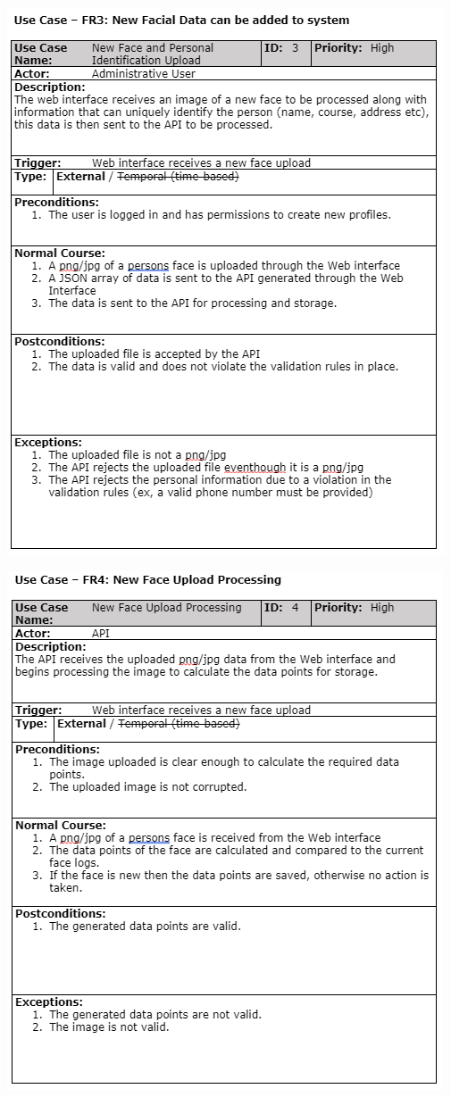 \documentclass[
  english,
  a4paper,
,tablecaptionabove
]{scrartcl}
\begin{document}
\includegraphics{images/ppm-images/use-case-3.png} \newpage

\includegraphics{images/ppm-images/use-case-4.png} \newpage
\end{document}

